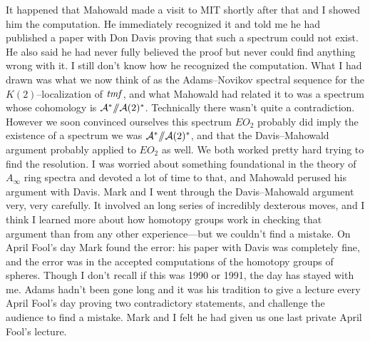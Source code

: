 It happened that Mahowald made a visit to MIT shortly after that and I
showed him the computation.  He immediately recognized it and told me
he had published a paper with Don Davis proving that such a spectrum
could not exist.  He also said he had never fully believed the proof
but never could find anything wrong with it.  I still don't know how
he recognized the computation.  What I had drawn was what we now think
of as the Adams--Novikov spectral sequence for the $K(2)$--localization
of $\mathit{tmf}$, and what Mahowald had related it to was a spectrum whose
cohomology is $\mathcal A^* /\!\!/ \mathcal A(2)^*$.
Technically there wasn't quite a contradiction.  However
we soon convinced ourselves this spectrum $EO_{2}$ probably did imply
the existence of a spectrum we was $\mathcal A^* /\!\!/ \mathcal A(2)^*$,
and that the
Davis--Mahowald argument probably applied to $EO_{2}$ as well.  We both
worked pretty hard trying to find the resolution.  I was worried about
something foundational in the theory of $A_{\infty}$ ring spectra and
devoted a lot of time to that, and Mahowald perused his argument with
Davis.  Mark and I went through the Davis--Mahowald argument very, very
carefully.  It involved an long series of incredibly dexterous moves,
and I think I learned more about how homotopy groups work in
checking that argument than from any other experience---but we
couldn't find a mistake.  On April Fool's day Mark found the
error: his paper with Davis was completely fine, and the error was in
the accepted computations of the homotopy groups of spheres.  Though I
don't recall if this was 1990 or 1991, the day has stayed with me.
Adams hadn't been gone long and it was his tradition to give a lecture
every April Fool's day proving two contradictory statements, and
challenge the audience to find a mistake.  Mark and I felt he had
given us one last private April Fool's lecture.

